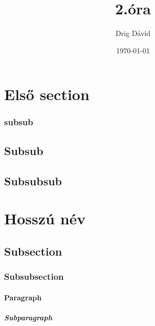 \documentclass{article}
\begin{document}
\title{2.óra}
\author{Drig Dávid}
\date{\today}
\maketitle


\setcounter{tocdepth}{5} 
\tableofcontents
{}

\clearpage

\setcounter{secnumdepth}{5}

\section{Első section}
\subsubsection{subsub}

\subsection{Subsub}
\hulipsum
\subsection{Subsubsub}
\hulipsum

\section[Rövid név]{Hosszú név}
\subsection{Subsection}
\subsubsection{Subsubsection}
\paragraph{Paragraph}
\subparagraph{Subparagraph}
\end{document}
